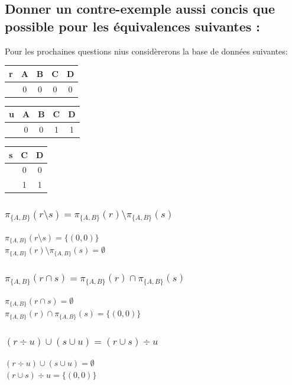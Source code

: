 \documentclass[10pt,a4paper,twoside]{article}
\begin{document}
\subsection{Donner un contre-exemple aussi concis que possible pour les équivalences suivantes :}
Pour les prochaines questions nius considèrerons la base de données suivantes:\\

\begin{tabular}{c|cccc}
r & A & B & C & D \\ 
\hline 
 & 0 & 0 & 0 & 0 \\ 
\end{tabular} 
\bigskip
\begin{tabular}{c|cccc}
u & A & B & C & D \\ 
\hline 
 & 0 & 0 & 1 & 1 \\ 
\end{tabular} 
\bigskip
\begin{tabular}{c|cc}
s & C & D \\ 
\hline 
 & 0 & 0 \\
 & 1 & 1 \\ 
\end{tabular} 

\subsubsection{$\pi_{\{A,B\}}(r \setminus s) = \pi_{\{A,B\}}(r) \setminus \pi_{\{A,B\}}(s)$}
\begin{flushleft}
$\pi_{\{A,B\}}(r \setminus s) = \{(0,0)\}$\\
$\pi_{\{A,B\}}(r) \setminus \pi_{\{A,B\}}(s) = \emptyset$\\
\end{flushleft}

\subsubsection{$\pi_{\{A,B\}}(r \cap s) = \pi_{\{A,B\}}(r) \cap \pi_{\{A,B\}}(s)$}
\begin{flushleft}
$\pi_{\{A,B\}}(r \cap s) = \emptyset$\\
$\pi_{\{A,B\}}(r) \cap \pi_{\{A,B\}}(s) = \{(0,0)\}$\\
\end{flushleft}

\subsubsection{$(r \div u) \cup (s \cup u) = (r \cup s) \div u$}
\begin{flushleft}
$(r \div u) \cup (s \cup u) = \emptyset$\\
$(r \cup s) \div u = \{(0,0)\}$\\
\end{flushleft}
\end{document}
